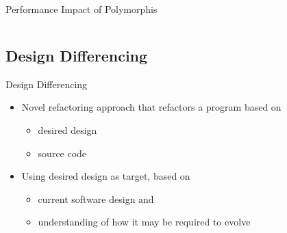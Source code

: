 \documentclass{beamer}
\begin{document}
\begin{frame}[fragile]{Performance Impact of Polymorphis}
  \begin{columns}[T]
    \begin{column}{.49\textwidth}
      
    \end{column}
    \begin{column}{.5\textwidth}
      
    \end{column}
  \end{columns}
\end{frame}

\subsection{Design Differencing}

\begin{frame}{Design Differencing}
  
  \begin{itemize}
    \item Novel refactoring approach that refactors a program based on 
    \begin{itemize}
      \item desired design
      \item source code
    \end{itemize}
    \pause
    \item Using desired design as target, based on
    \begin{itemize}
      \item current software design and
      \item understanding of how it may be required to evolve
    \end{itemize}
  \end{itemize}
\end{frame}
\end{document}
